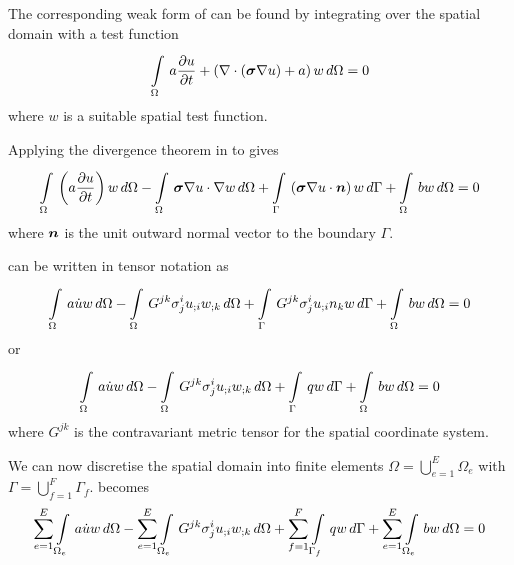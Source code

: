 
The corresponding weak form of  can be found by
integrating over the spatial domain with a test function \ie
\begin{equation}
  \gint{\Omega}{}{a\delby{u}{t}+\pbrac{\divergence{}{\pbrac{\tensor{\sigma}
          \gradient{}{u}}}+a}w}{\Omega}=0
  \label{eqn:diffusionweakform1}
\end{equation}
where $w$ is a suitable spatial test function.

Applying the divergence theorem in 
to  gives
\begin{equation}
  \gint{\Omega}{}{\pbrac{a\delby{u}{t}}w}{\Omega}-
      \gint{\Omega}{}{\dotprod{\tensor{\sigma}\gradient{}{u}}{\gradient{}{w}}}{\Omega}
      +\gint{\Gamma}{}{\pbrac{\dotprod{\tensor{\sigma}\gradient{}{u}}{\normal}}w}{\Gamma}+
      \gint{\Omega}{}{bw}{\Omega}=0
  \label{eqn:diffusionweakform2}
\end{equation}
where $\boldsymbol{n}$ is the unit outward normal vector to the boundary $\Gamma$.


 can be written in tensor notation as
\begin{equation}
  \gint{\Omega}{}{a\dot{u}w}{\Omega}-
  \gint{\Omega}{}{G^{jk}\sigma^{i}_{j}\covarderiv{u}{i}\covarderiv{w}{k}}{\Omega}+
  \gint{\Gamma}{}{G^{jk}\sigma^{i}_{j}\covarderiv{u}{i}n_{k}w}{\Gamma} +
  \gint{\Omega}{}{bw}{\Omega}=0
  \label{eqn:diffusiontensorform1}
\end{equation}
or
\begin{equation}
  \gint{\Omega}{}{a\dot{u}w}{\Omega}-
  \gint{\Omega}{}{G^{jk}\sigma^{i}_{j}\covarderiv{u}{i}\covarderiv{w}{k}}{\Omega}+
  \gint{\Gamma}{}{qw}{\Gamma} +
  \gint{\Omega}{}{bw}{\Omega}=0
  \label{eqn:diffusiontensorform2}
\end{equation}
where $G^{jk}$ is the contravariant metric tensor for the spatial coordinate system.


We can now discretise the spatial domain into finite elements \ie $\Omega=
\displaystyle{\bigcup_{e=1}^{E}}\Omega_{e}$ with
$\Gamma=\displaystyle{\bigcup_{f=1}^{F}}\Gamma_{f}$. 
 becomes
\begin{equation}
  \dsum_{e=1}^{E}\gint{\Omega_{e}}{}{a\dot{u}w}{\Omega}-
  \dsum_{e=1}^{E}\gint{\Omega_{e}}{}{G^{jk}\sigma^{i}_{j}
    \covarderiv{u}{i}\covarderiv{w}{k}}{\Omega}+
  \dsum_{f=1}^{F}\gint{\Gamma_{f}}{}{qw}{\Gamma} +
  \dsum_{e=1}^{E}\gint{\Omega_{e}}{}{bw}{\Omega}=0
  \label{eqn:diffusionfemform}
\end{equation}

